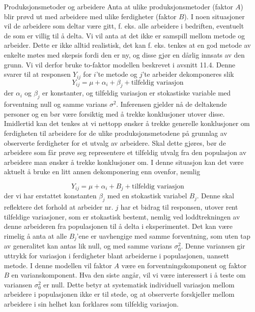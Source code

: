 \begin{eksempel}{Produksjonsmetoder og arbeidere}
Anta at ulike produksjonsmetoder (faktor $A$) blir prøvd ut med 
arbeidere med ulike ferdigheter (faktor $B$).  I noen situasjoner vil
de arbeidere som deltar være gitt, f. eks. alle arbeidere i
bedriften, eventuelt de som er villig til å delta.  Vi vil anta at
det ikke er samspill mellom metode og arbeider. Dette er ikke alltid 
realistisk, det kan f. eks. tenkes at en god metode av enkelte møtes 
med skepsis fordi den er ny, og disse gjør en dårlig innsats av
den grunn.  Vi vil derfor bruke to-faktor modellen beskrevet i avsnitt
11.4.  Denne svarer til at responsen $Y_{ij}$ for $i$'te metode og 
$j$'te arbeider dekomponeres slik
\[     Y_{ij} = \mu + {\alpha}_i + {\beta}_j + \mbox{tilfeldig variasjon}  \]
der ${\alpha}_i$ og ${\beta}_j$ er konstanter, og tilfeldig variasjon
er stokastiske variable med forventning null og samme varians 
${\sigma}^2$.  Inferensen gjelder nå de deltakende personer og en
bør være forsiktig med å trekke konklusjoner utover disse.
Imidlertid kan det tenkes at vi nettopp ønsker å trekke generelle 
konklusjoner om ferdigheten til arbeidere for de ulike 
produksjonsmetodene på grunnlag av observerte ferdigheter for et
utvalg av arbeidere.  Skal dette gjøres, bør de arbeidere som får
prøve seg representere et tilfeldig utvalg fra den populasjon av
arbeidere man ønsker å trekke konklusjoner om.  I denne situasjon
kan det være aktuelt å bruke en litt annen dekomponering enn
ovenfor, nemlig

\[   Y_{ij} = \mu + {\alpha}_i + B_j + \mbox{tilfeldig variasjon}  \]
der vi har erstattet konstanten ${\beta}_j$ med en stokastisk 
variabel $B_j$.  Denne skal reflektere det forhold at arbeider nr. $j$
har et bidrag til responsen, utover rent tilfeldige variasjoner, som 
er stokastisk bestemt, nemlig ved loddtrekningen av denne arbeideren
fra populasjonen til å delta i eksperimentet.  Det kan være 
rimelig å anta at alle $B_j$'ene er uavhengige med samme 
forventning, som uten tap av generalitet kan antas lik null, og med
samme varians ${\sigma}_0^2$.  Denne variansen gir uttrykk for
variasjon i ferdigheter blant arbeiderne i populasjonen, uansett
metode.  I denne modellen vil faktor $A$ være en forventningskomponent
og faktor $B$ en varianskomponent.  Hva den siste angår, vil vi
være interessert i å teste om  variansen ${\sigma}_0^2$ er
null. Dette betyr at systematisk individuell variasjon mellom
arbeidere i popu\-lasjonen ikke er til stede, og at observerte forskjeller
mellom arbeidere i sin helhet kan forklares som tilfeldig variasjon.


\end{eksempel}
